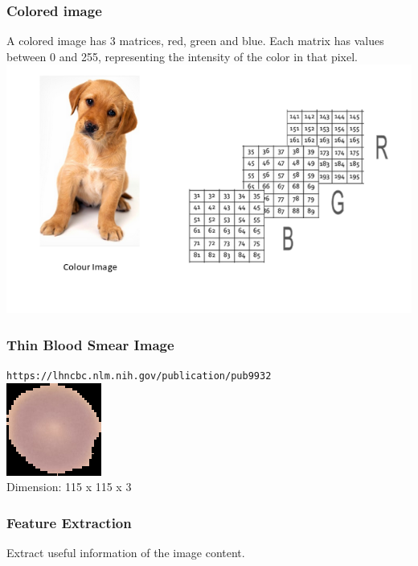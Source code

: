 \begin{frame}[fragile]
  \frametitle{Colored image}
  A colored image has 3 matrices, red, green and blue. Each matrix has
  values between 0 and 255, representing the intensity of the color in that
  pixel.\\
  \vspace{3mm}
  \includegraphics[scale=0.4]{img/img_3}
\end{frame}

\begin{frame}[fragile]
  \frametitle{Thin Blood Smear Image}
  \verb|https://lhncbc.nlm.nih.gov/publication/pub9932|\\
  \vspace{3mm}
  \includegraphics[scale=1]{img/img_4}\\
  \vspace{3mm}
  Dimension: 115 x 115 x 3
\end{frame}

\begin{frame}[fragile]
  \frametitle{Feature Extraction}
  Extract useful information of the image content.
\end{frame}
